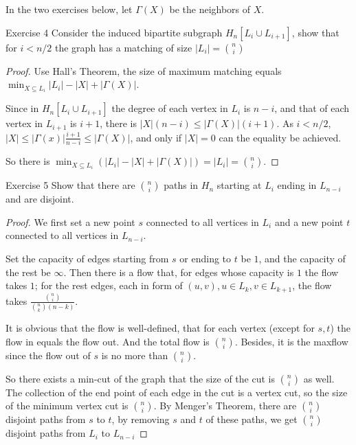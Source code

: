     In the two exercises below, let $\Gamma(X)$ be the neighbors of $X$. 
    \begin{thm}{Exercise 4}{}
        Consider the induced bipartite subgraph $H_n[L_i\cup L_{i+1}]$, show that for $i<n/2$ the graph has a matching of size $|L_i|=\binom{n}{i}$
    \end{thm}
    \begin{proof}
        Use Hall's Theorem, the size of maximum matching equals $\min_{X\subseteq L_i}|L_i|-|X|+|\Gamma(X)|$. 

        Since in $H_n[L_i\cup L_{i+1}]$ the degree of each vertex in $L_i$ is $n-i$, 
        and that of each vertex in $L_{i+1}$ is $i+1$, there is $|X|(n-i)\leq|\Gamma(X)|(i+1)$. 
        As $i<n/2$, $|X|\leq|\Gamma(x)|\frac{i+1}{n-i}\leq|\Gamma(X)|$, and only if $|X|=0$ can the equality be achieved. 

        So there is $\min_{X\subseteq L_i}(|L_i|-|X|+|\Gamma(X)|)=|L_i|=\binom{n}{i}$. 
    \end{proof} 

    \begin{thm}{Exercise 5}{}
        Show that there are $\binom{n}{i}$ paths in $H_n$ starting at $L_i$ ending in $L_{n-i}$ and are disjoint. 
    \end{thm}
    \begin{proof}
        We first set a new point $s$ connected to all vertices in $L_i$ and a new point $t$ connected to all vertices in $L_{n-i}$. 
        
        Set the capacity of edges starting from $s$ or ending to $t$ be $1$, and the capacity of the rest be $\infty$. 
        Then there is a flow that, for edges whose capacity is $1$ the flow takes $1$; for the rest edges, 
        each in form of $(u,v), u\in L_k,v\in L_{k+1}$, the flow takes $\frac{\binom{n}{i}}{\binom{n}{k}(n-k)}$. 

        It is obvious that the flow is well-defined, that for each vertex (except for $s,t$) the flow in equals the flow out. 
        And the total flow is $\binom{n}{i}$. Besides, it is the maxflow since the flow out of $s$ is no more than $\binom{n}{i}$. 

        So there exists a min-cut of the graph that the size of the cut is $\binom{n}{i}$ as well. 
        The collection of the end point of each edge in the cut is a vertex cut, 
        so the size of the minimum vertex cut is $\binom{n}{i}$. 
        By Menger's Theorem, there are $\binom{n}{i}$ disjoint paths from $s$ to $t$, 
        by removing $s$ and $t$ of these paths, we get $\binom{n}{i}$ disjoint paths from $L_i$ to $L_{n-i}$ 
        
    \end{proof} 

